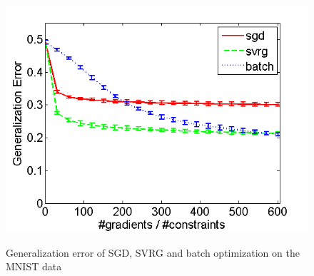 \documentclass[letterpaper]{article}
\begin{document}
\begin{figure}
{				\includegraphics[scale=0.33]{MNIST_TSTE_200_test.png}
			}
			\caption{Generalization error of SGD, SVRG and batch optimization on the MNIST data}
			\label{fig:2} %
		\end{figure}
\end{document}
